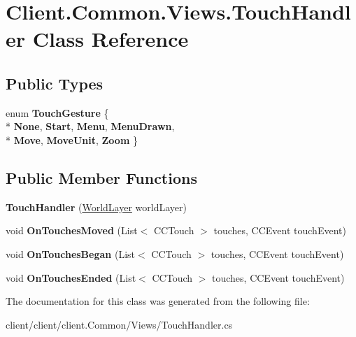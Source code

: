 \hypertarget{classClient_1_1Common_1_1Views_1_1TouchHandler}{\section{Client.\-Common.\-Views.\-Touch\-Handler Class Reference}
\label{classClient_1_1Common_1_1Views_1_1TouchHandler}
}
\subsection*{Public Types}
\begin{DoxyCompactItemize}
\item 
enum {\bfseries Touch\-Gesture} \{ \\*
{\bfseries None}, 
{\bfseries Start}, 
{\bfseries Menu}, 
{\bfseries Menu\-Drawn}, 
\\*
{\bfseries Move}, 
{\bfseries Move\-Unit}, 
{\bfseries Zoom}
 \}
\end{DoxyCompactItemize}
\subsection*{Public Member Functions}
\begin{DoxyCompactItemize}
\item 
\hypertarget{classClient_1_1Common_1_1Views_1_1TouchHandler_aa2c2df17a66537d6201a3cf1db1b619d}{{\bfseries Touch\-Handler} (\hyperlink{classClient_1_1Common_1_1Views_1_1WorldLayer}{World\-Layer} world\-Layer)}\label{classClient_1_1Common_1_1Views_1_1TouchHandler_aa2c2df17a66537d6201a3cf1db1b619d}

\item 
\hypertarget{classClient_1_1Common_1_1Views_1_1TouchHandler_ad028e4ba02913c0d9d4cb55a658b07aa}{void {\bfseries On\-Touches\-Moved} (List$<$ C\-C\-Touch $>$ touches, C\-C\-Event touch\-Event)}\label{classClient_1_1Common_1_1Views_1_1TouchHandler_ad028e4ba02913c0d9d4cb55a658b07aa}

\item 
\hypertarget{classClient_1_1Common_1_1Views_1_1TouchHandler_ac21679b308098e955aecb76562481078}{void {\bfseries On\-Touches\-Began} (List$<$ C\-C\-Touch $>$ touches, C\-C\-Event touch\-Event)}\label{classClient_1_1Common_1_1Views_1_1TouchHandler_ac21679b308098e955aecb76562481078}

\item 
\hypertarget{classClient_1_1Common_1_1Views_1_1TouchHandler_a3598c47862156c696862c5017567d630}{void {\bfseries On\-Touches\-Ended} (List$<$ C\-C\-Touch $>$ touches, C\-C\-Event touch\-Event)}\label{classClient_1_1Common_1_1Views_1_1TouchHandler_a3598c47862156c696862c5017567d630}

\end{DoxyCompactItemize}


The documentation for this class was generated from the following file\-:\begin{DoxyCompactItemize}
\item 
client/client/client.\-Common/\-Views/Touch\-Handler.\-cs\end{DoxyCompactItemize}
